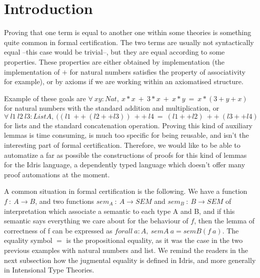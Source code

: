 \section{Introduction}

Proving that one term is equal to another one within some theories is something quite common in formal certification. The two terms are usually not syntactically equal --this case would be trivial--, but they are equal according to some properties. These properties are either obtained by implementation (the implementation of $+$ for natural numbers satisfies the property of associativity for example), or by axioms if we are working within an axiomatised structure. 

Example of these goals are $\forall\ xy:Nat,\ x*x\ +\ 3*x\ +\ x*y\ =\ x*(3+y+x)$ for natural numbers with the standard addition and multiplication, or $\forall\ l1\ l2\ l3:List A,\ ((l1\ ++\ (l2 ++ l3))\ ++\ l4\ =\ (l1++l2)\ ++\ (l3++l4)$ for lists and the standard concatenation operation. Proving this kind of auxiliary lemmas is time consuming, is much too specific for being reusable, and isn't the interesting part of formal certification. Therefore, we would like to be able to automatize a far as possible the constructions of proofs for this kind of lemmas for the Idris language, a dependently typed language which doesn't offer many proof automations at the moment.

A common situation in formal certification is the following. We have a function $f\ :\ A \rightarrow B$, and two functions $sem_A\ :\ A \rightarrow SEM$ and $sem_B\ : \ B \rightarrow SEM$ of interpretation which associate a semantic to each type A and B, and if this semantic says everything we care about for the behaviour of $f$, then the lemma of correctness of f can be expressed as $forall\ a:A,\ semA\ a = semB (f\ a)$.
The equality symbol $=$ is the propositional equality, as it was the case in the two previous examples with natural numbers and list. We remind the readers in the next subsection how the jugmental equality is defined in Idris, and more generally in Intensional Type Theories.


